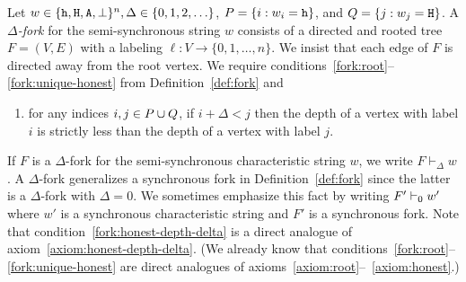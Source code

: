   \begin{definition}\label{def:delta-fork}
    Let $w\in \{\mathtt{h}, \mathtt{H}, \mathtt{A}, \perp\}^n, \Delta \in \{0, 1, 2, \ldots \}$, 
    $P = \{ i : w_i = \mathtt{h}\}$, and $Q = \{ j : w_j = \mathtt{H}\}$. 
    A \emph{$\Delta$-fork} for the semi-synchronous string $w$ consists of a directed and rooted
    tree $F=(V,E)$ with a labeling $\ell:V \to \{0,1,\ldots,n\}$. We insist
    that each edge of $F$ is directed away from the root vertex. 
    We require conditions~\ref{fork:root}--\ref{fork:unique-honest} 
    from Definition~\ref{def:fork} and 
    \begin{enumerate}[label=(F{\arabic*}\textsubscript{$\Delta$}), start=4]



      \item\label{fork:honest-depth-delta} 
      for any indices $i,j\in P \cup Q$, 
      if $i + \Delta < j$ then 
      the depth of a vertex with label $i$ 
      is strictly less than 
      the depth of a vertex with label $j$.
    \end{enumerate}
  \end{definition}
  If $F$ is a $\Delta$-fork for the semi-synchronous characteristic string $w$, we write
  $F\vdash_\Delta w$.  
  A $\Delta$-fork generalizes a synchronous fork in Definition~\ref{def:fork} 
  since the latter is a $\Delta$-fork with $\Delta = 0$. 
  We sometimes emphasize this fact by writing $F' \vdash_0 w'$ 
  where $w'$ is a synchronous characteristic string and $F'$ is a synchronous fork.
  Note that 
  condition~\ref{fork:honest-depth-delta} 
  is a direct analogue of axiom~\ref{axiom:honest-depth-delta}.
  (We already know that conditions~\ref{fork:root}--\ref{fork:unique-honest} 
  are direct
  analogues of axioms~\ref{axiom:root}--~\ref{axiom:honest}.) 


